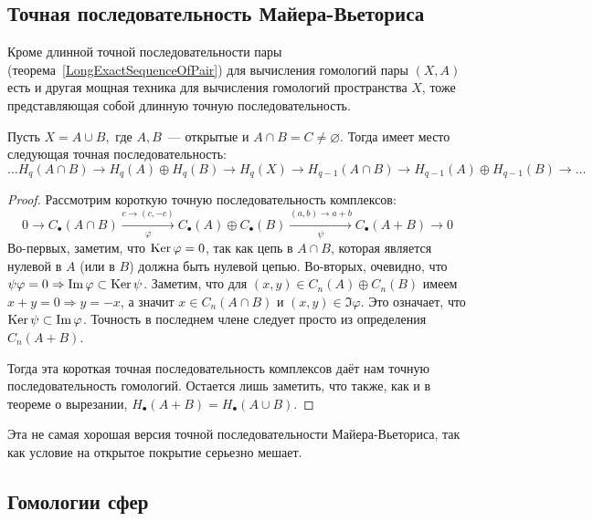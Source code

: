     \subsection{Точная последовательность Майера-Вьеториса}

    Кроме длинной точной последовательности пары (теорема~\ref{LongExactSequenceOfPair}) для вычисления гомологий пары $(X, A)$
    есть и другая мощная техника для вычисления гомологий пространства $X$, тоже представляющая собой длинную точную последовательность.

    \begin{theorem}\label{Mayer–Vietoris_sequence}
        Пусть $X = A \cup B,$ где $A, B$~--- открытые и $A \cap B  = C \neq \varnothing$.
    Тогда имеет место следующая точная последовательность:
    \[ \ldots  H_{q}(A \cap B) \to H_{q}(A) \oplus H_{q}(B) \to H_{q}(X) \to H_{q - 1}(A \cap B) \to H_{q - 1}(A) \oplus H_{q - 1}(B)  \to \ldots \]
    \end{theorem}
    \begin{proof}
        Рассмотрим короткую точную последовательность  комплексов:
        \[ 0 \to C_{\bullet}(A \cap B) \xrightarrow[\varphi]{c \to (c, -c)} C_{\bullet}(A) \oplus C_{\bullet}(B) \xrightarrow[\psi]{(a, b) \to a + b} C_{\bullet}(A + B) \to 0\]
        Во-первых, заметим, что $\operatorname{Ker}{\varphi} = 0$, так как цепь  в $A \cap B$, которая является нулевой в $A$ (или в $B$) должна быть нулевой цепью.
        Во-вторых, очевидно, что $\psi\varphi = 0 \Rightarrow \mathop{\mathrm{Im}}\nolimits{\varphi} \subset \operatorname{Ker}{\psi}$. Заметим, что для $(x, y) \in C_{n}(A) \oplus C_{n}(B)$
        имеем $x + y = 0 \Rightarrow y = -x$, а значит $x \in C_{n}(A \cap B)$ и $(x, y) \in \Im{\varphi}$. Это означает, что
        $\operatorname{Ker}{\psi} \subset \mathop{\mathrm{Im}}\nolimits{\varphi}$. Точность в последнем члене следует просто из определения $C_{n}(A + B)$.

        Тогда эта короткая точная последовательность комплексов даёт нам точную последовательность гомологий. Остается лишь заметить, что
        также, как и в теореме о вырезании, $H_{\bullet}(A + B) = H_{\bullet}(A \cup B)$.
    \end{proof}

    \begin{remark}
       Эта не самая хорошая версия точной последовательности Майера-Вьеториса, так как условие на открытое покрытие серьезно мешает.
    \end{remark}   

    \subsection{Гомологии сфер}

